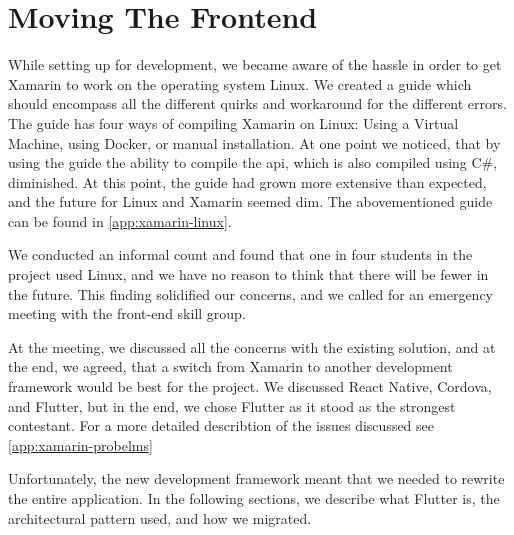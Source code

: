 \section{Moving The Frontend}

While setting up for development, we became aware of the hassle in order to get Xamarin to work on the operating system Linux. We created a guide which should encompass all the different quirks and workaround for the different errors. The guide has four ways of compiling Xamarin on Linux: Using a Virtual Machine, using Docker, or manual installation. At one point we noticed, that by using the guide the ability to compile the \gls{api}, which is also compiled using C\#, diminished. At this point, the guide had grown more extensive than expected, and the future for Linux and Xamarin seemed dim. The abovementioned guide can be found in \autoref{app:xamarin-linux}.

We conducted an informal count and found that one in four students in the project used Linux, and we have no reason to think that there will be fewer in the future. This finding solidified our concerns, and we called for an emergency meeting with the front-end skill group.

At the meeting, we discussed all the concerns with the existing solution, and at the end, we agreed, that a switch from Xamarin to another development framework would be best for the project. We discussed React Native\cite{react-native:website}, Cordova\cite{cordova:website}, and Flutter\cite{flutter:website}, but in the end, we chose Flutter as it stood as the strongest contestant. For a more detailed describtion of the issues discussed see \autoref{app:xamarin-probelms}

Unfortunately, the new development framework meant that we needed to rewrite the entire application. In the following sections, we describe what Flutter is, the architectural pattern used, and how we migrated.
